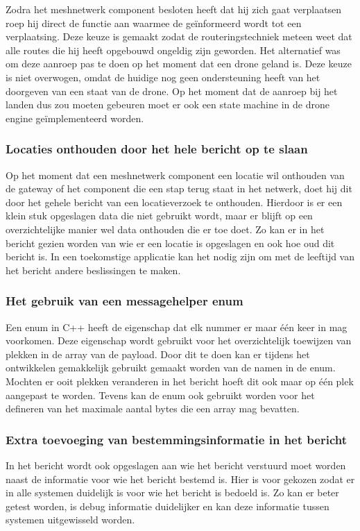 \documentclass[a4paper, 11pt, oneside]{report}
\begin{document}
Zodra het meshnetwerk component besloten heeft dat hij zich gaat verplaatsen roep hij direct de functie aan waarmee de  geïnformeerd wordt tot een verplaatsing.
Deze keuze is gemaakt zodat de routeringstechniek meteen weet dat alle routes die hij heeft opgebouwd ongeldig zijn geworden.
Het alternatief was om deze aanroep pas te doen op het moment dat een drone geland is.
Deze keuze is niet overwogen, omdat de huidige  nog geen ondersteuning heeft van het doorgeven van een staat van de drone.
Op het moment dat de aanroep bij het landen dus zou moeten gebeuren moet er ook een state machine in de drone engine geïmplementeerd worden. 
 
\subsubsection{Locaties onthouden door het hele bericht op te slaan}

Op het moment dat een meshnetwerk component een locatie wil onthouden van de gateway of het component die een stap terug staat in het netwerk, doet hij dit door het gehele bericht van een locatieverzoek te onthouden.
Hierdoor is er een klein stuk opgeslagen data die niet gebruikt wordt, maar er blijft op een overzichtelijke manier wel data onthouden die er toe doet. 
Zo kan er in het bericht gezien worden van wie er een locatie is opgeslagen en ook hoe oud dit bericht is.
In een toekomstige applicatie kan het nodig zijn om met de leeftijd van het bericht andere beslissingen te maken.  

\subsubsection{Het gebruik van een messagehelper enum}

Een enum in C++ heeft de eigenschap dat elk nummer er maar één keer in mag voorkomen. 
Deze eigenschap wordt gebruikt voor het overzichtelijk toewijzen van plekken in de array van de payload. 
Door dit te doen kan er tijdens het ontwikkelen gemakkelijk gebruikt gemaakt worden van de namen in de enum.
Mochten er ooit plekken veranderen in het bericht hoeft dit ook maar op één plek aangepast te worden.
Tevens kan de enum ook gebruikt worden voor het defineren van het maximale aantal bytes die een array mag bevatten. 

\subsubsection{Extra toevoeging van bestemmingsinformatie in het bericht}
In het bericht wordt ook opgeslagen aan wie het bericht verstuurd moet worden naast de informatie voor wie het bericht bestemd is.
Hier is voor gekozen zodat er in alle systemen duidelijk is voor wie het bericht is bedoeld is.
Zo kan er beter getest worden, is debug informatie duidelijker en kan deze informatie tussen systemen uitgewisseld worden.
\end{document}
